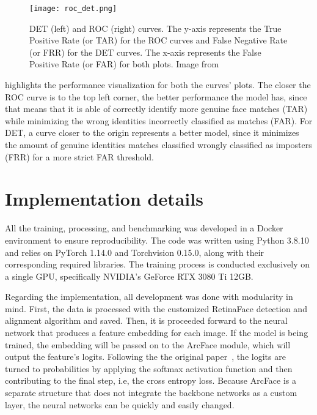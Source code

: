 \documentclass[class=report, crop=false, a4paper, 12pt]{standalone}
\begin{document}

\begin{figure}[H]
  \centering
  \texttt{[image: roc\_det.png]}
  \caption{DET (left) and ROC (right) curves. The y-axis represents the True Positive Rate (or TAR) for the ROC curves and False Negative Rate (or FRR) for the DET curves. The x-axis represents the False Positive Rate (or FAR) for both plots. Image from~\autocite{saenz-lechonMethodologicalIssuesDevelopment2006}}
  \label{fig:roc_curve}
\end{figure}

\par {} highlights the performance visualization for both the curves' plots. The closer the ROC curve is to the top left corner, the better performance the model has, since that means that it is able of correctly identify more genuine face matches (TAR) while minimizing the wrong identities incorrectly classified as matches (FAR). For DET, a curve closer to the origin represents a better model, since it minimizes the amount of genuine identities matches classified wrongly classified as imposters (FRR) for a more strict FAR threshold.

\section{Implementation details}
\par All the training, processing, and benchmarking was developed in a Docker environment to ensure reproducibility. The code was written using Python 3.8.10 and relies on PyTorch 1.14.0 and Torchvision 0.15.0, along with their corresponding required libraries. The training process is conducted exclusively on a single GPU, specifically NVIDIA's GeForce RTX 3080 Ti 12GB. 
\par Regarding the implementation, all development was done with modularity in mind. First, the data is processed with the customized RetinaFace detection and alignment algorithm and saved. Then, it is proceeded forward to the neural network that produces a feature embedding for each image. If the model is being trained, the embedding will be passed on to the ArcFace module, which will output the feature's logits. Following the the original paper~\autocite{dengArcFaceAdditiveAngular}, the logits are turned to probabilities by applying the softmax activation function and then contributing to the final step, i.e, the cross entropy loss. Because ArcFace is a separate structure that does not integrate the backbone networks as a custom layer, the neural networks can be quickly and easily changed.
\end{document}
